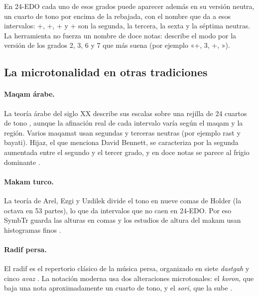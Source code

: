 En 24-EDO cada uno de esos grados puede aparecer además en su versión neutra, un cuarto de tono por encima de la
rebajada, con el nombre que \citet[§6]{wyschnegradsky2017} da a esos intervalos: +, +, + y + son la
segunda, la tercera, la sexta y la séptima neutras. La herramienta no fuerza un nombre de doce notas: describe el modo por la versión de los grados 2, 3, 6 y 7 que
más suena (por ejemplo «+, 3, +, »).

\subsection{La microtonalidad en otras tradiciones}

\paragraph{Maqam árabe.} La teoría árabe del siglo XX describe sus escalas sobre una rejilla de 24 cuartos de tono \citep{touma1996},
aunque la afinación real de cada intervalo varía según el maqam y la región. Varios maqamat usan segundas y terceras
neutras (por ejemplo rast y bayati). Hijaz, el que menciona David Bennett, se caracteriza por la segunda aumentada entre
el segundo y el tercer grado, y en doce notas se parece al frigio dominante \citep{touma1996}.

\paragraph{Makam turco.} La teoría de Arel, Ezgi y Uzdilek divide el tono en nueve comas de Holder (la octava en 53
partes), lo que da intervalos que no caen en 24-EDO. Por eso SymbTr guarda las alturas en comas \citep{karaosmanoglu2012}
y los estudios de altura del makam usan histogramas finos \citep{bozkurt2008,gedik2010}.

\paragraph{Radif persa.} El radif es el repertorio clásico de la música persa, organizado en siete \emph{dastgah} y cinco
\emph{avaz} \citep{farhat1990}. La notación moderna usa dos alteraciones microtonales: el \emph{koron}, que baja una nota
aproximadamente un cuarto de tono, y el \emph{sori}, que la sube \citep{kanani2025}.

